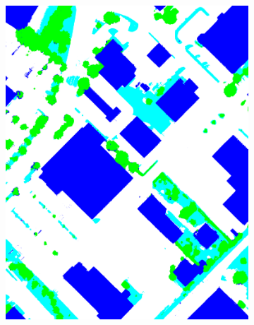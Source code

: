\begin{figure}[htb]
\begin{subfigure}{0.19\textwidth}
  \includegraphics[width=1\linewidth]{fig/vai/32_anno.png}
\end{subfigure}
\begin{subfigure}{0.19\textwidth}
  \centering

\end{subfigure}
\end{figure}
